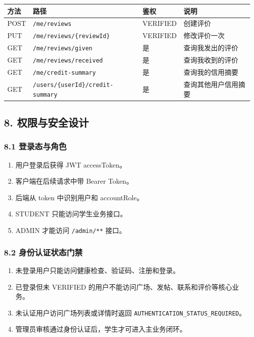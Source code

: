 \documentclass[
]{ctexart}
\providecommand{\tightlist}{%
  \setlength{\itemsep}{0pt}\setlength{\parskip}{0pt}}
\begin{document}
\begin{longtable}[]{@{}llll@{}}
\toprule
方法 & 路径 & 鉴权 & 说明 \\
\midrule
\endhead
POST & \texttt{/me/reviews} & VERIFIED & 创建评价 \\
PUT & \texttt{/me/reviews/\{reviewId\}} & VERIFIED & 修改评价一次 \\
GET & \texttt{/me/reviews/given} & 是 & 查询我发出的评价 \\
GET & \texttt{/me/reviews/received} & 是 & 查询我收到的评价 \\
GET & \texttt{/me/credit-summary} & 是 & 查询我的信用摘要 \\
GET & \texttt{/users/\{userId\}/credit-summary} & 是 &
查询其他用户信用摘要 \\
\bottomrule
\end{longtable}

\hypertarget{ux6743ux9650ux4e0eux5b89ux5168ux8bbeux8ba1}{%
\subsection{8.
权限与安全设计}\label{ux6743ux9650ux4e0eux5b89ux5168ux8bbeux8ba1}}

\hypertarget{ux767bux5f55ux6001ux4e0eux89d2ux8272}{%
\subsubsection{8.1
登录态与角色}\label{ux767bux5f55ux6001ux4e0eux89d2ux8272}}

\begin{enumerate}
\def\labelenumi{\arabic{enumi}.}
\tightlist
\item
  用户登录后获得 JWT accessToken。
\item
  客户端在后续请求中带 Bearer Token。
\item
  后端从 token 中识别用户和 accountRole。
\item
  STUDENT 只能访问学生业务接口。
\item
  ADMIN 才能访问 \texttt{/admin/**} 接口。
\end{enumerate}

\hypertarget{ux8eabux4efdux8ba4ux8bc1ux72b6ux6001ux95e8ux7981}{%
\subsubsection{8.2
身份认证状态门禁}\label{ux8eabux4efdux8ba4ux8bc1ux72b6ux6001ux95e8ux7981}}

\begin{enumerate}
\def\labelenumi{\arabic{enumi}.}
\tightlist
\item
  未登录用户只能访问健康检查、验证码、注册和登录。
\item
  已登录但未 VERIFIED 的用户不能访问广场、发帖、联系和评价等核心业务。
\item
  未认证用户访问广场列表或详情时返回
  \texttt{AUTHENTICATION\_STATUS\_REQUIRED}。
\item
  管理员审核通过身份认证后，学生才可进入主业务闭环。
\end{enumerate}
\end{document}
